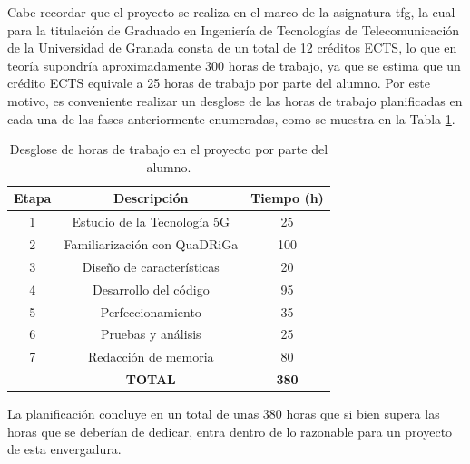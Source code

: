  Cabe recordar que el proyecto se realiza en el marco de la asignatura \ac{tfg}, la cual para la titulación de Graduado en Ingeniería de Tecnologías de Telecomunicación de la Universidad de Granada consta de un total de 12 créditos ECTS, lo que en teoría supondría aproximadamente 300 horas de trabajo, ya que se estima que un crédito ECTS equivale a 25 horas de trabajo por parte del alumno. Por este motivo, es conveniente realizar un desglose de las horas de trabajo planificadas en cada una de las fases anteriormente enumeradas, como se muestra en la Tabla \ref{tab:horas}.
 
 \begin{table}[ht!]
\centering
\caption{Desglose de horas de trabajo en el proyecto por parte del alumno.}
\label{tab:horas}
\begin{tabular}{c|c|c|}
\hline
\multicolumn{1}{|c|}{\textbf{Etapa}} & \textbf{Descripción}         & \multicolumn{1}{l|}{\textbf{Tiempo (h)}} \\ \hline
\multicolumn{1}{|c|}{1}              & Estudio de la Tecnología 5G  & 25                                       \\ \hline
\multicolumn{1}{|c|}{2}              & Familiarización con QuaDRiGa & 100                                      \\ \hline
\multicolumn{1}{|c|}{3}              & Diseño de características    & 20                                       \\ \hline
\multicolumn{1}{|c|}{4}              & Desarrollo del código        & 95                                       \\ \hline
\multicolumn{1}{|c|}{5}              & Perfeccionamiento            & 35                                       \\ \hline
\multicolumn{1}{|c|}{6}              & Pruebas y análisis           & 25                                       \\ \hline
\multicolumn{1}{|c|}{7}              & Redacción de memoria         & 80                                       \\ \hline
                                     & \textbf{TOTAL}               & \textbf{380}                             \\ \cline{2-3} 
\end{tabular}
\end{table}

La planificación concluye en un total de unas 380 horas que si bien supera las horas que se deberían de dedicar, entra dentro de lo razonable para un proyecto de esta envergadura.

